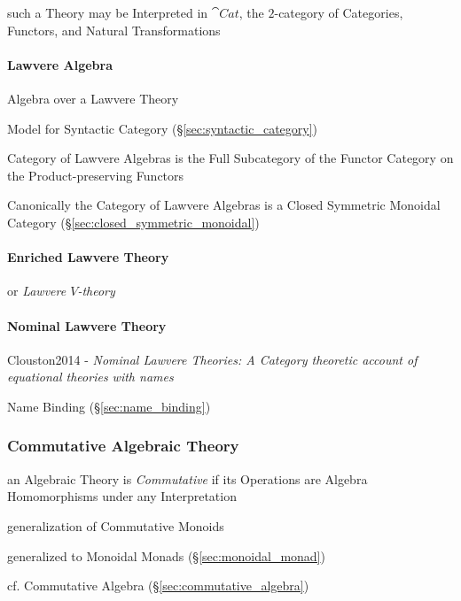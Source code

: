 such a Theory may be Interpreted in $\cat{Cat}$, the $2$-category of Categories,
Functors, and Natural Transformations



\paragraph{Lawvere Algebra}\label{sec:lawvere_algebra}\hfill

Algebra over a Lawvere Theory

Model for Syntactic Category (\S\ref{sec:syntactic_category})

Category of Lawvere Algebras is the Full Subcategory of the Functor
Category on the Product-preserving Functors %

Canonically the Category of Lawvere Algebras is a Closed Symmetric
Monoidal Category (\S\ref{sec:closed_symmetric_monoidal})



\paragraph{Enriched Lawvere Theory}\label{sec:enriched_lawvere}\hfill
\cite{hyland-power06}

or \emph{Lawvere $V$-theory}



\paragraph{Nominal Lawvere Theory}\label{sec:nominal_lawvere_theory}\hfill

Clouston2014 - \emph{Nominal Lawvere Theories: A Category theoretic account of
  equational theories with names}

Name Binding (\S\ref{sec:name_binding})



\subsubsection{Commutative Algebraic Theory}
\label{sec:commutative_algebraic_theory}

an Algebraic Theory is \emph{Commutative} if its Operations are Algebra
Homomorphisms under any Interpretation

generalization of Commutative Monoids

generalized to Monoidal Monads (\S\ref{sec:monoidal_monad})

\fist cf. Commutative Algebra (\S\ref{sec:commutative_algebra})



